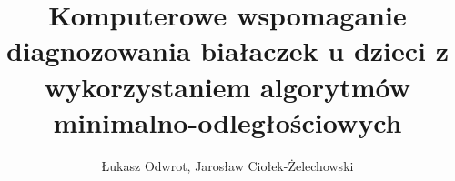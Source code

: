 \documentclass[comsoc]{IEEEtran}
\begin{document}
	\title{Komputerowe wspomaganie diagnozowania białaczek u dzieci z wykorzystaniem algorytmów minimalno-odległościowych}
	\author{Łukasz Odwrot, Jarosław Ciołek-Żelechowski}
	\maketitle
	













\end{document}
